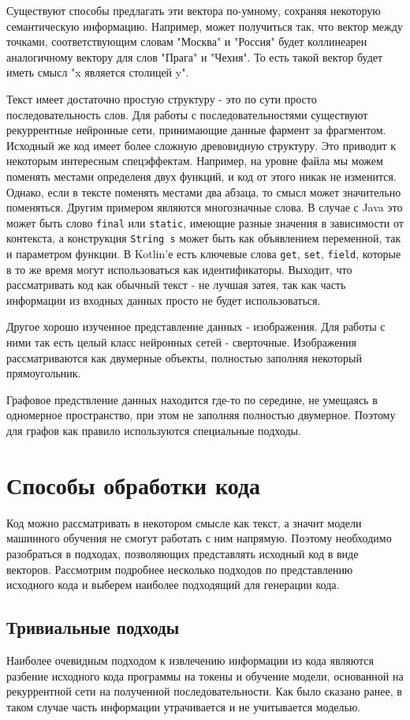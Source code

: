 \documentclass[times,specification,annotation]{itmo-student-thesis}
\begin{document}
Существуют способы предлагать эти вектора по-умному, сохраняя некоторую семантическую информацию. Например, может получиться так, что вектор между точками, соответствующим словам "Москва" и "Россия" будет коллинеарен аналогичному вектору для слов "Прага" и "Чехия". То есть такой вектор будет иметь смысл "x является столицей y".

Текст имеет достаточно простую структуру - это по сути просто последовательность слов. Для работы с последовательностями существуют рекуррентные нейронные сети, принимающие данные фармент за фрагментом. Исходный же код имеет более сложную древовидную структуру. Это приводит к некоторым интересным спецэффектам. Например, на уровне файла мы можем поменять местами определеня двух функций, и код от этого никак не изменится. Однако, если в тексте поменять местами два абзаца, то смысл может значительно поменяться. Другим примером являются многозначные слова. В случае с Java это может быть слово \texttt{final} или \texttt{static}, имеющие разные значения в зависимости от контекста, а конструкция \texttt{String s} может быть как объявлением переменной, так и параметром функции. В Kotlin'е есть ключевые слова \texttt{get}, \texttt{set}, \texttt{field}, которые в то же время могут использоваться как идентификаторы. Выходит, что рассматривать код как обычный текст - не лучшая затея, так как часть информации из входных данных просто не будет использоваться.

Другое хорошо изученное представление данных - изображения. Для работы с ними так есть целый класс нейронных сетей - сверточные. Изображения рассматриваются как двумерные объекты, полностью заполняя некоторый прямоугольник.

Графовое предствление данных находится где-то по середине, не умещаясь в одномерное пространство, при этом не заполняя полностью двумерное. Поэтому для графов как правило используются специальные подходы.

\section{Способы обработки кода}\label{workingWithCode}
Код можно рассматривать в некотором смысле как текст, а значит модели машинного обучения не смогут работать с ним напрямую. Поэтому необходимо разобраться в подходах, позволяющих представлять исходный код в виде векторов. Рассмотрим подробнее несколько подходов по представлению исходного кода и выберем наиболее подходящий для генерации кода.

\subsection{Тривиальные подходы}\label{trivial}
Наиболее очевидным подходом к извлечению информации из кода являются разбение исходного кода программы на токены и обучение модели, основанной на рекуррентной сети на полученной последовательности. Как было сказано ранее, в таком случае часть информации утрачивается и не учитывается моделью.
\end{document}
